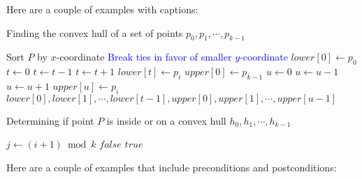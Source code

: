 Here are a couple of examples with captions:
\begin{algorithm}[H]
    \caption{Finding the convex hull of a set of points $p_0,p_1,\cdots,p_{k-1}$}
    \label{alg:convex-hull}
    \begin{algorithmic}[1]
        \State Sort $P$ by $x$-coordinate
        \Comment\textcolor{blue}{Break ties in favor of smaller $y$-coordinate}
        \Statex
        \State $lower[0]\gets p_0$
        \State $t\gets0$
        \State $t\gets t-1$
        \EndWhile
        \Statex
        \State $t\gets t+1$
        \State $lower[t]\gets p_i$
        \EndFor
        \Statex
        \State $upper[0]\gets p_{k-1}$
        \State $u\gets0$
        \State $u\gets u-1$
        \EndWhile
        \Statex
        \State $u\gets u+1$
        \State $upper[u]\gets p_i$
        \EndFor
        \Statex
        $lower[0], lower[1],\cdots,lower[t-1],upper[0],
        upper[1],\cdots,upper[u-1]$
        \EndProcedure
    \end{algorithmic}
\end{algorithm}

\begin{algorithm}[H]
    \caption{Determining if point $P$ is inside or on a convex hull $h_0,h_1,\cdots,
    h_{k-1}$}
    \label{alg:inside-convex-hull}
    \begin{algorithmic}[1]
        \State $j\gets(i+1)\bmod k$
        $false$
        \EndIf
        \EndFor
        \Statex
        $true$
        \EndProcedure
    \end{algorithmic}
\end{algorithm}

Here are a couple of examples that include preconditions and postconditions:

